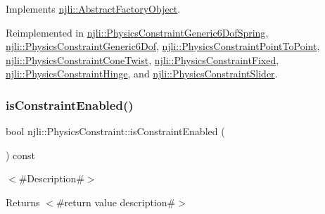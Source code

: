 Implements \mbox{\hyperlink{classnjli_1_1_abstract_factory_object_a207c86146d40d0794708ae7f2d4e60a7}{njli\+::\+Abstract\+Factory\+Object}}.



Reimplemented in \mbox{\hyperlink{classnjli_1_1_physics_constraint_generic6_dof_spring_a2fecef82051a7d6f1a51a81ca5621798}{njli\+::\+Physics\+Constraint\+Generic6\+Dof\+Spring}}, \mbox{\hyperlink{classnjli_1_1_physics_constraint_generic6_dof_aa3004e4d926ca03e19209b5ee79817d9}{njli\+::\+Physics\+Constraint\+Generic6\+Dof}}, \mbox{\hyperlink{classnjli_1_1_physics_constraint_point_to_point_a1daae07c31eb59ee245674d465919cec}{njli\+::\+Physics\+Constraint\+Point\+To\+Point}}, \mbox{\hyperlink{classnjli_1_1_physics_constraint_cone_twist_a78562bcb3f15cde1a2628732cc917fd7}{njli\+::\+Physics\+Constraint\+Cone\+Twist}}, \mbox{\hyperlink{classnjli_1_1_physics_constraint_fixed_a15e1155bd37763d3e7d012bcb12a4d26}{njli\+::\+Physics\+Constraint\+Fixed}}, \mbox{\hyperlink{classnjli_1_1_physics_constraint_hinge_ae31ea0358f051f773a4f06b52f6c92ff}{njli\+::\+Physics\+Constraint\+Hinge}}, and \mbox{\hyperlink{classnjli_1_1_physics_constraint_slider_a7cc1bbd160314dabb3c6764a8ea1e307}{njli\+::\+Physics\+Constraint\+Slider}}.

\mbox{\label{classnjli_1_1_physics_constraint_abb9996d3456e93ba7027d85f038d10a9}} 
\subsubsection{\texorpdfstring{is\+Constraint\+Enabled()}{isConstraintEnabled()}}
{\footnotesize\ttfamily bool njli\+::\+Physics\+Constraint\+::is\+Constraint\+Enabled (\begin{DoxyParamCaption}{ }\end{DoxyParamCaption}) const}

$<$\#\+Description\#$>$

\begin{DoxyReturn}{Returns}
$<$\#return value description\#$>$ 
\end{DoxyReturn}
\mbox{\label{classnjli_1_1_physics_constraint_ab423c0c46435ea5630e50f1f39fb1dd8}} 
